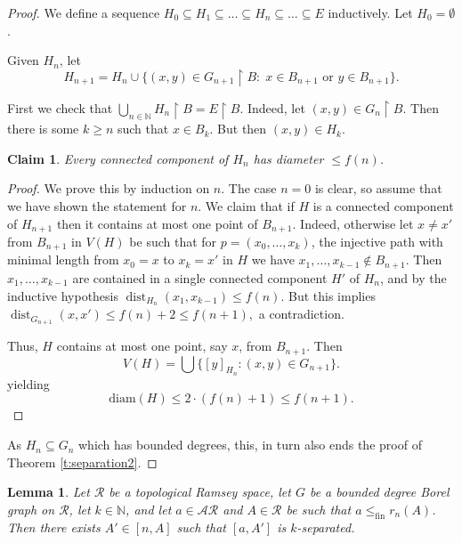 \documentclass[10pt,a4paper]{amsart}
\newcommand{\N}{\mathbb{N}}
\renewcommand{\restriction}[2]{#1 \upharpoonright #2}
\newtheorem{lemma}[theorem]{Lemma}
\newtheorem{claim}[theorem]{Claim}
\theoremstyle{definition}
\DeclareMathOperator{\dist}{dist}
\newcommand{\rstr}{\restriction}
\newcommand{\sse}{\subseteq}
\newcommand{\fA}{\mathcal{A}}
\newcommand{\fR}{\mathcal{R}}
\begin{document}
	\begin{proof}
		
		We define a sequence $H_0 \subseteq H_1 \subseteq \dots \subseteq H_n \subseteq \dots \subseteq E$ inductively. Let $H_0=\emptyset$. 
		
		Given $H_n$, let \[H_{n+1}=H_{n} \cup \{(x,y) \in \restriction{G_{n+1}}{B}:\; x\in B_{n+1} \text{ or } y\in B_{n+1}\}.\]
		
		First we check that $\rstr{\bigcup_{n \in \N} H_n}{B}=\restriction{E}{B}$. Indeed, let $(x,y) \in \rstr{G_n}{B}$. Then there is some $k \geq n$ such that $x \in B_k$. But then $(x,y) \in H_k$. 
		
		\begin{claim}
			Every connected component of $H_n$ has diameter $\le f(n)$. 
			
		\end{claim}
		\begin{proof}
			We prove this by induction on $n$. The case $n=0$ is clear, so assume that we have shown the statement for $n$. We claim that if $H$ is a connected component of $H_{n+1}$ then it contains at most one point of $B_{n+1}$. Indeed, otherwise let $x \neq x' $ from $B_{n+1}$ in $V(H)$ be such that for $p=(x_0,\dots,x_k)$, the injective path with minimal length from $x_0=x$ to $x_k=x'$ in $H$ we have $x_1,\ldots,x_{k-1}\notin B_{n+1}$. Then $x_1,\ldots,x_{k-1}$ are contained in a single connected component $H'$ of $H_n$, and by the inductive hypothesis $\dist_{H_n}(x_1,x_{k-1})\le f(n).$ But this implies $\dist_{G_{n+1}}(x,x')\le f(n)+2\le f(n+1),$ a contradiction.
			
			Thus, $H$ contains at most one point, say $x$, from $B_{n+1}$. Then \[V(H)=\bigcup \{[y]_{H_{n}}:(x,y) \in G_{n+1}\}.\]
			yielding \[\text{diam}(H) \le 2\cdot (f(n)+1) \le f(n+1).\]
		\end{proof}
		
		As $H_n\sse G_n$ which has bounded degrees, this, in turn also ends the proof of Theorem \ref{t:separation2}.
	\end{proof}

	\begin{lemma}
		\label{l:graph canonization}
		Let $\fR$ be a topological Ramsey space, let $G$ be a bounded degree Borel graph on $\fR$, let $k\in \N$, and let $a\in \fA\fR$ and $A\in\fR$ be such that $a\le_{\text{fin}}r_n(A)$. Then there exists $A'\in [n,A]$ such that $[a,A']$ is $k$-separated.
	\end{lemma}
	
	
	
\end{document}
